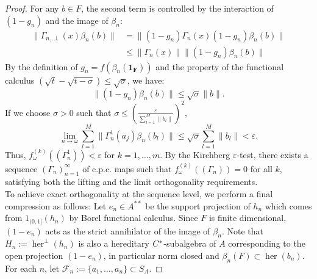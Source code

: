 \documentclass[12pt]{amsart}
\theoremstyle{plain}
\theoremstyle{definition}
\def\her{\operatorname{her}}
\newcommand{\mc}{\mathcal}
\numberwithin{equation}{section}
\begin{document}
\begin{proof}
    
    For any $b \in F$, the second term is controlled by the interaction of $(1-g_n)$ and the image of $\beta_n$:
    \begin{align*}
    \|\Gamma_{n, \perp}(x) \beta_n(b)\| &= \|(1-g_n) \Gamma_n(x) (1-g_n) \beta_n(b)\| \\
    &\le \|\Gamma_n(x)\| \|(1-g_n) \beta_n(b)\|
    \end{align*}
    By the definition of $g_n = f(\beta_n(\mathbf{1_F}))$ and the property of the functional calculus $(\sqrt{t} - \sqrt{t-\sigma}) \le \sqrt{\sigma}$, we have:
    \[ \|(1-g_n) \beta_n(b)\| \le \sqrt{\sigma} \|b\|. \]
  If we choose $\sigma>0$ such that $\sigma \le \left( \frac{\varepsilon}{\sum_{l=1}^M \|b_l \|}\right)^2$, 
    \[ \lim_{n \to \omega} \sum_{l=1}^M \|\Gamma^1_n(a_j)\beta_n(b_l)\| \le \sqrt{\sigma} \sum_{ l =1}^{M} \|b_l\| < \varepsilon. \]
 Thus, $f^{(k)}_{\omega}((\Gamma^1_n)) < \varepsilon$ for $k=1, \dots, m$. By the Kirchberg $\varepsilon$-test, there exists a sequence $(\Gamma_n)_{n=1}^{\infty}$ of c.p.c. maps such that $f^{(k)}_{\omega}((\Gamma_n)) = 0$ for all $k$, satisfying both the lifting and the limit orthogonality requirements. \\
 
To achieve exact orthogonality at the sequence level, we perform a final compression as follows:
Let $e_n \in A^{**}$ be the support projection of $h_n$ which comes from $1_{(0, 1]}(h_n)$ by Borel functional calculus. Since $F$ is finite dimensional, $(1-e_n)$ acts as the strict annihilator of the image of $\beta_n$.
Note that $H_n:=\her^{\perp}(h_n)$ is also a hereditary $C\sp*$-subalgebra of $A$ corresponding to the open projection $(1-e_n)$, in particular norm closed \cite{P} and $\beta_n(F) \subset \her(b_n)$. 
For each $n$, let $\mc{F}_n:=\{a_1, \dots, a_n\} \subset  S_A$.  


\end{proof}
\end{document}
